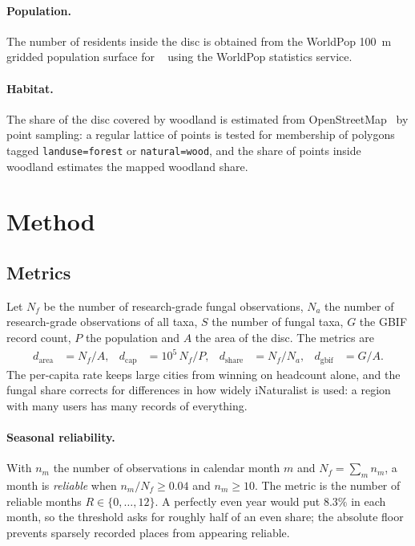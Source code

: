\documentclass[11pt,a4paper]{article}
\begin{document}
\paragraph{Population.} The number of residents inside the disc is obtained from the WorldPop
100~m gridded population surface for \MLSWorldPopYear{}~\cite{worldpop} using the WorldPop statistics service.

\paragraph{Habitat.} The share of the disc covered by woodland is estimated from
OpenStreetMap~\cite{osm} by point sampling: a regular lattice of points is tested for membership of
polygons tagged \texttt{landuse=forest} or \texttt{natural=wood}, and the share of points inside woodland
estimates the mapped woodland share.

\section{Method}\label{sec:method}

\subsection{Metrics}

Let $N_f$ be the number of research-grade fungal observations, $N_a$ the number of research-grade
observations of all taxa, $S$ the number of fungal taxa, $G$ the GBIF record count, $P$ the population and
$A$ the area of the disc. The metrics are
\begin{align*}
d_{\text{area}} &= N_f / A, & d_{\text{cap}} &= 10^5\, N_f / P, & d_{\text{share}} &= N_f / N_a, & d_{\text{gbif}} &= G / A .
\end{align*}
The per-capita rate keeps large cities from winning on headcount alone, and the fungal share corrects for
differences in how widely iNaturalist is used: a region with many users has many records of everything.

\paragraph{Seasonal reliability.} With $n_m$ the number of observations in calendar month $m$ and
$N_f=\sum_m n_m$, a month is \emph{reliable} when $n_m/N_f \ge 0.04$ and $n_m \ge 10$. The metric is the
number of reliable months $R\in\{0,\dots,12\}$. A perfectly even year would put $8.3\%$ in each month, so
the threshold asks for roughly half of an even share; the absolute floor prevents sparsely recorded
places from appearing reliable.
\end{document}
